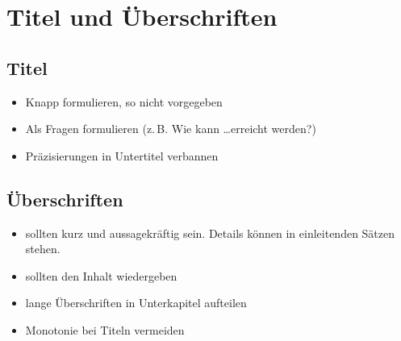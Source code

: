 \section{Titel und Überschriften}
\subsection{Titel}
\begin{itemize}\itemsep0em
	\item Knapp formulieren, so nicht vorgegeben
	\item Als Fragen formulieren (z.\,B. Wie kann \dots erreicht werden?)
	\item Präzisierungen in Untertitel verbannen
\end{itemize}

\subsection{Überschriften}
\begin{itemize}\itemsep0em
	\item sollten kurz und aussagekräftig sein. Details können in einleitenden Sätzen stehen. 
	\item sollten den Inhalt wiedergeben
	\item lange Überschriften in Unterkapitel aufteilen
	\item Monotonie bei Titeln vermeiden
\end{itemize}